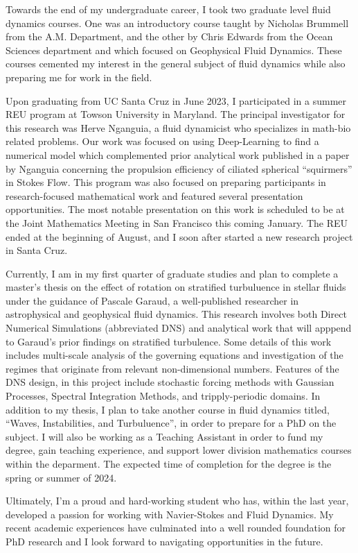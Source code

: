 \documentclass{article}
\begin{document}
Towards the end of my undergraduate career, I took two graduate level fluid dynamics courses. One was an introductory course taught by Nicholas Brummell from the A.M. Department, and the other by Chris Edwards from the Ocean Sciences department and which focused on Geophysical Fluid Dynamics. These courses cemented my interest in the general subject of fluid dynamics while also preparing me for work in the field. 

Upon graduating from UC Santa Cruz in June 2023, I participated in a summer REU program at Towson University in Maryland. The principal investigator for this research was Herve Nganguia, a fluid dynamicist who specializes in math-bio related problems. Our work was focused on using Deep-Learning to find a numerical model which complemented prior analytical work published in a paper by Nganguia concerning the propulsion efficiency of ciliated spherical ``squirmers'' in Stokes Flow. This program was also focused on preparing participants in research-focused mathematical work and featured several presentation opportunities. The most notable presentation on this work is scheduled to be at the Joint Mathematics Meeting in San Francisco this coming January. The REU ended at the beginning of August, and I soon after started a new research project in Santa Cruz. 

Currently, I am in my first quarter of graduate studies and plan to complete a master's thesis on the effect of rotation on stratified turbuluence in stellar fluids under the guidance of Pascale Garaud, a well-published researcher in astrophysical and geophysical fluid dynamics. This research involves both Direct Numerical Simulations (abbreviated DNS) and analytical work that will apppend to Garaud's prior findings on stratified turbulence. Some details of this work includes multi-scale analysis of the governing equations and investigation of the regimes that originate from relevant non-dimensional numbers. Features of the DNS design, in this project include stochastic forcing methods with Gaussian Processes, Spectral Integration Methods, and tripply-periodic domains. In addition to my thesis, I plan to take another course in fluid dynamics titled, ``Waves, Instabilities, and Turbuluence'', in order to prepare for a PhD on the subject. I will also be working as a Teaching Assistant in order to fund my degree, gain teaching experience, and support lower division mathematics courses within the deparment. The expected time of completion for the degree is the spring or summer of 2024. 

Ultimately, I'm a proud and hard-working student who has, within the last year, developed a passion for working with Navier-Stokes and Fluid Dynamics. My recent academic experiences have culminated into a well rounded foundation for PhD research and I look forward to navigating opportunities in the future. 

\end{document}
